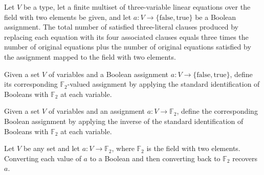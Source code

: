 \begin{theorem}
\label{FABL.satisfiedCount_e3LinConstraintsToE3Sat}
\leanok
{}
Let $V$ be a type, let a finite multiset of three-variable linear equations over the
field with two elements be given, and let $a:V\to\{\mathrm{false},\mathrm{true}\}$ be a
Boolean assignment. The total number of satisfied three-literal clauses produced by
replacing each equation with its four associated clauses equals three times the number
of original equations plus the number of original equations satisfied by the assignment
mapped to the field with two elements.
\end{theorem}

\begin{definition}
\leanok
{}
Given a set $V$ of variables and a Boolean assignment
$a:V\to\{\mathrm{false},\mathrm{true}\}$, define its corresponding $\mathbb F_2$-valued
assignment by applying the standard identification of Booleans with $\mathbb F_2$ at
each variable.
\end{definition}

\begin{definition}
\leanok
{}
Given a set $V$ of variables and an assignment $a:V\to\mathbb F_2$, define the
corresponding Boolean assignment by applying the inverse of the standard identification
of Booleans with $\mathbb F_2$ at each variable.
\end{definition}

\begin{theorem}
\leanok
{}
Let $V$ be any set and let $a:V\to\mathbb{F}_2$, where $\mathbb{F}_2$ is the field with
two elements. Converting each value of $a$ to a Boolean and then converting back to
$\mathbb{F}_2$ recovers $a$.
\end{theorem}

